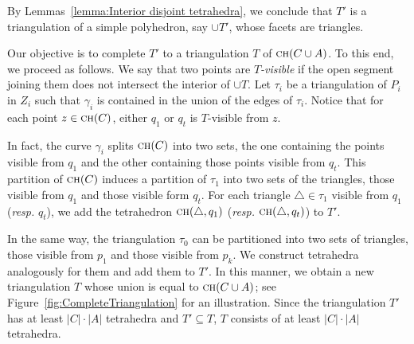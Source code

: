 \documentclass[a4paper, 11pt]{article}
\newcommand{\ch}[1]{\ensuremath{\textsc{ch}(#1)}}
\begin{document}
By Lemmas~\ref{lemma:Interior disjoint tetrahedra}, we conclude that $T'$ is a triangulation of a simple polyhedron, say $\cup T'$, whose facets are triangles.

Our objective is to complete $T'$ to a triangulation $T$ of $\ch{C\cup A}$. To this end, we proceed as follows.
We say that two points are \emph{$T$-visible} if the open segment joining them does not intersect the interior of $\cup T$.
Let $\tau_i$ be a triangulation of $P_i$ in $Z_i$ such that $\gamma_i$ is contained in the union of the edges of $\tau_i$.
Notice that for each point $z\in \ch{C}$, either $q_1$ or $q_t$ is $T$-visible from $z$. 

In fact, the curve $\gamma_i$ splits $\ch{C}$ into two sets, the one containing the points visible from $q_1$ and the other containing those points visible from $q_t$.
This partition of $\ch{C}$ induces a partition of $\tau_1$ into two sets of the triangles, those visible from $q_1$ and those visible form $q_t$.
For each triangle $\triangle\in \tau_1$ visible from $q_1$ (\emph{resp.} $q_t$), we add the tetrahedron $\ch{\triangle, q_1}$ (\emph{resp.} $\ch{\triangle, q_t}$) to $T'$. 

In the same way, the triangulation $\tau_0$ can be partitioned into two sets of triangles, those visible from $p_1$ and those visible from $p_k$. We construct tetrahedra analogously for them and add them to $T'$.
In this manner, we obtain a new triangulation $T$ whose union is equal to $\ch{C\cup A}$; see Figure~\ref{fig:CompleteTriangulation} for an illustration.
Since the triangulation $T'$ has at least $|C|\cdot |A|$ tetrahedra and $T'\subseteq T$, $T$ consists of at least $|C|\cdot |A|$ tetrahedra.
\end{document}

